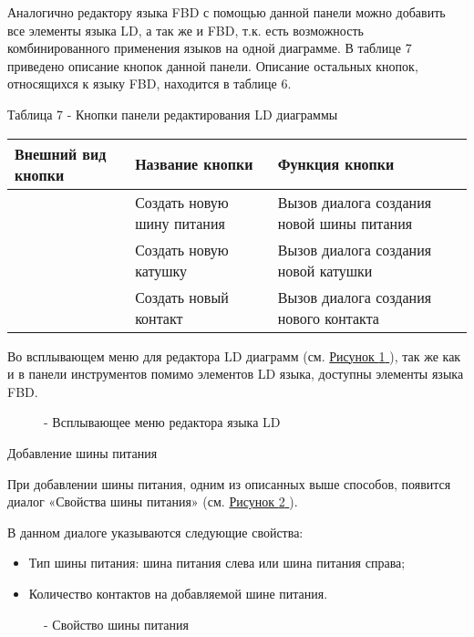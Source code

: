 \documentclass[letterpaper,10pt,russian]{sphinxmanual}
\begin{document}
Аналогично редактору языка FBD с помощью данной панели можно добавить
все элементы языка LD, а так же и FBD, т.к. есть возможность
комбинированного применения языков на одной диаграмме. В таблице 7
приведено описание кнопок данной панели. Описание остальных кнопок,
относящихся к языку FBD, находится в таблице 6.

Таблица 7 - Кнопки панели редактирования LD диаграммы

\noindent\begin{tabulary}{\linewidth}{|L|L|L|}
\hline
\textsf{\relax 
Внешний вид кнопки
\unskip}\relax &\textsf{\relax 
Название кнопки
\unskip}\relax &\textsf{\relax 
Функция кнопки
\unskip}\relax \\
\hline
{}
&
Создать новую шину
питания
&
Вызов диалога
создания новой шины
питания
\\
\hline
{}
&
Создать новую катушку
&
Вызов диалога
создания новой
катушки
\\
\hline
{}
&
Создать новый контакт
&
Вызов диалога
создания нового
контакта
\\
\hline\end{tabulary}


Во всплывающем меню для редактора LD диаграмм (см. \hyperref[usage_guide/ide_components:image75]{Рисунок \ref{usage_guide/ide_components:image75} }), так же как
и в панели инструментов помимо элементов LD языка, доступны элементы
языка FBD.
\begin{figure}[htbp]
\centering
\capstart

\noindent{}
\caption{- Всплывающее меню редактора языка LD}\label{usage_guide/ide_components:image75}\end{figure}

Добавление шины питания

При добавлении шины питания, одним из описанных выше способов, появится
диалог «Свойства шины питания» (см. \hyperref[usage_guide/ide_components:image76]{Рисунок \ref{usage_guide/ide_components:image76} }).

В данном диалоге указываются следующие свойства:
\begin{itemize}
\item {} 
Тип шины питания: шина питания слева или шина питания справа;

\item {} 
Количество контактов на добавляемой шине питания.

\end{itemize}
\begin{figure}[htbp]
\centering
\capstart

\noindent{}
\caption{- Свойство шины питания}\label{usage_guide/ide_components:image76}\end{figure}
\end{document}

